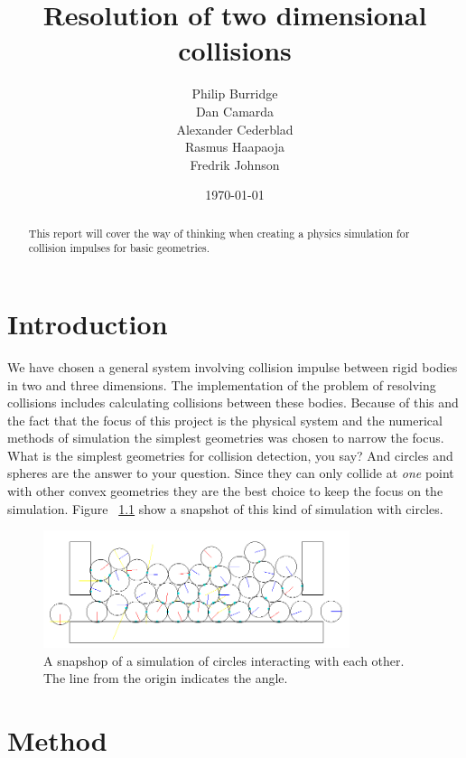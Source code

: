 \documentclass[a4paper,12pt]{report}
\title{Resolution of two dimensional collisions}
\author{Philip Burridge\\
        Dan Camarda\\
        Alexander Cederblad\\
        Rasmus Haapaoja\\
        Fredrik Johnson}
\date{\today}
\begin{document}
\maketitle


\begin{abstract}
This report will cover the way of thinking when creating a physics simulation for collision impulses for basic geometries.
\end{abstract}


\tableofcontents
{}


\chapter{Introduction}
\setcounter{page}{1}

We have chosen a general system involving collision impulse between rigid bodies in two and three dimensions. The implementation of the problem of resolving collisions includes calculating collisions between these bodies. Because of this and the fact that the focus of this project is the physical system and the numerical methods of simulation the simplest geometries was chosen to narrow the focus. What is the simplest geometries for collision detection, you say? And circles and spheres are the answer to your question. Since they can only collide at \emph{one} point with other convex geometries they are the best choice to keep the focus on the simulation. Figure ~\ref{fig:snapshot} show a snapshot of this kind of simulation with circles.

\begin{figure}[!h]
    \centering
    \includegraphics[width=0.8\textwidth]{figures/snapshot.png}
    \caption{A snapshop of a simulation of circles interacting with each other. The line from the origin indicates the angle.}
    \label{fig:snapshot}
\end{figure}


\chapter{Method}
\end{document}
